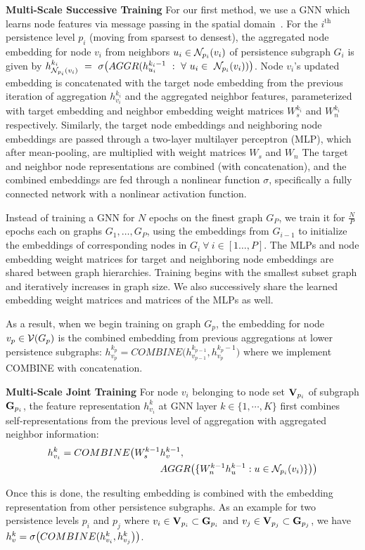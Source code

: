
\noindent \textbf{Multi-Scale Successive Training}
For our first method, we use a GNN which learns node features via message passing in the spatial domain~\cite{graphsage}.  For the $i^{\text{th}}$ persistence level $p_i$ (moving from sparsest to densest), the aggregated node embedding for node $v_i$ from neighbors $u_i\in \mathcal{N}_{p_i}(v_i)$ of persistence subgraph $G_i$ is given by 
$
h_{\mathcal{N}_{p_i}(v_i)}^{k_i}~=~\sigma\big(AGGR(h_{u_i}^{k_{i}-1}~:~\forall~u_i \in~\mathcal{N}_{p_i}(v_i)  )  \big)
$.  Node $v_i$'s updated embedding is concatenated %
with the target node embedding from the previous iteration of aggregation $h_{v_i}^{k_i}$ and the aggregated neighbor features,  parameterized with target embedding and neighbor embedding weight matrices $W_{s}^{k_i}$ and $W_{n}^{k_i}$ respectively. Similarly, the target node embeddings and neighboring node embeddings are passed through a two-layer multilayer perceptron (MLP), which after mean-pooling, are multiplied with weight matrices $W_{s}$ and $W_{n}$ The target and neighbor node representations are combined (with concatenation), and the combined embeddings are fed through a nonlinear function $\sigma$, specifically a fully connected network with a nonlinear activation function. 

Instead of training a GNN for $N$ epochs on the finest graph $G_P$, we train it for $\frac{N}{P}$ epochs each on graphs $G_1, \ldots, G_P$, using the embeddings from $G_{i-1}$ to initialize the embeddings of corresponding nodes in $G_i~\forall ~ i \in [1 \ldots, P]$. The MLPs and node embedding weight matrices for target and neighboring node embeddings are shared between graph hierarchies. Training begins with the smallest subset graph and iteratively increases in graph size. We also successively share the learned embedding weight matrices and matrices of the MLPs as well.

As a result, when we begin training on graph $G_p$, the embedding for node $v_p \in \mathcal{V}(G_p)$ is the combined embedding from previous aggregations at lower persistence subgraphs:
    $h_{v_p}^{k_p} = COMBINE\big( h_{v_{p-1}}^{k_{p-1}}, h_{v_p}^{k_p - 1}\big)$
    where we implement COMBINE with concatenation.

\noindent \textbf{Multi-Scale Joint Training}
For node $v_i$ belonging to node set $\mathbf{V}_{p_i}$ of subgraph $\mathbf{G}_{p_i}$, the feature representation $h_{v_i}^k$ at GNN layer $k \in \{1,\cdots, K \}$ 
first combines self-representations from the previous level of aggregation with aggregated neighbor information:
\begin{align*}
h_{v_i}^{k} = COMBINE\big(  W_{s}^{k-1} & h_{v}^{k-1} , \\ &AGGR\big(\{W_{n}^{k-1} h_{u}^{k-1} : u \in \mathcal{N}_{p_i}(v_i)\}\big)\big)
\end{align*}


Once this is done, the resulting embedding is combined with the embedding representation from other persistence subgraphs.  As an example for two persistence levels $p_i$ and $p_j$ where $ v_i \in \mathbf{V}_{p_i} \subset \mathbf{G}_{p_i}$ and $ v_j \in \mathbf{V}_{p_j}\subset \mathbf{G}_{p_j}$, we have
$h_{v}^{k} = \sigma \big( COMBINE( h_{v_{i}}^{k} ,h_{v_{j}}^{k} \big)\big)$. 



